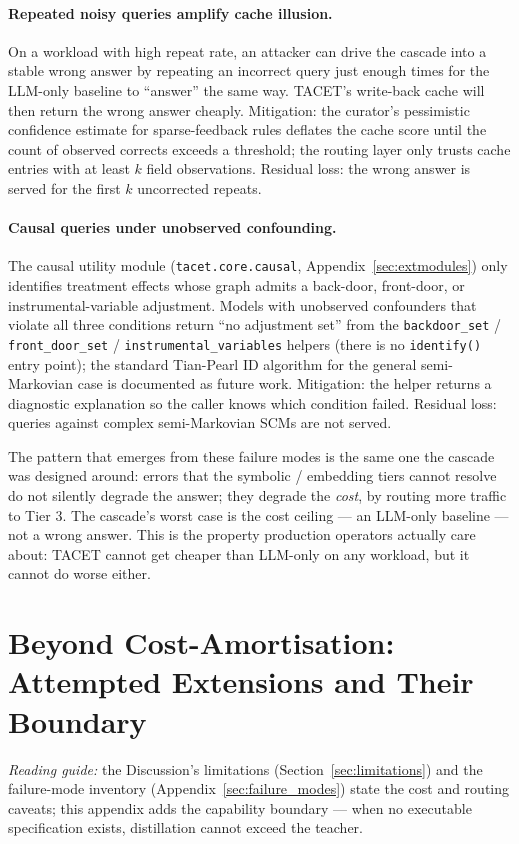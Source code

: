 \documentclass[11pt]{article}
\theoremstyle{plain}
\begin{document}
\paragraph{Repeated noisy queries amplify cache illusion.}
On a workload with high repeat rate, an attacker can drive the
cascade into a stable wrong answer by repeating an incorrect query
just enough times for the LLM-only baseline to ``answer'' the same
way.  TACET's write-back cache will then return the wrong answer
cheaply.  Mitigation: the curator's pessimistic confidence estimate
for sparse-feedback rules deflates the cache score until the count
of observed corrects exceeds a threshold; the routing layer only
trusts cache entries with at least $k$ field observations.  Residual
loss: the wrong answer is served for the first $k$ uncorrected
repeats.

\paragraph{Causal queries under unobserved confounding.}
The causal utility module (\texttt{tacet.core.causal},
Appendix~\ref{sec:extmodules}) only identifies treatment effects whose
graph admits a back-door, front-door, or instrumental-variable
adjustment.  Models with
unobserved confounders that violate all three conditions return
``no adjustment set'' from the \texttt{backdoor\_set} /
\texttt{front\_door\_set} / \texttt{instrumental\_variables} helpers (there is
no \texttt{identify()} entry point); the
standard Tian-Pearl ID algorithm for the general semi-Markovian case is
documented as future work.  Mitigation: the helper returns a
diagnostic explanation so the caller knows which condition failed.
Residual loss: queries against complex semi-Markovian SCMs are not
served.

The pattern that emerges from these failure modes is the same one
the cascade was designed around: errors that the symbolic /
embedding tiers cannot resolve do not silently degrade the answer;
they degrade the \emph{cost}, by routing more traffic to Tier 3.
The cascade's worst case is the cost ceiling --- an LLM-only
baseline --- not a wrong answer.  This is the property production
operators actually care about: TACET cannot get cheaper than
LLM-only on any workload, but it cannot do worse either.

\section{Beyond Cost-Amortisation: Attempted Extensions and Their Boundary}
\label{sec:boundary}
\noindent\emph{Reading guide:} the Discussion's limitations
(Section~\ref{sec:limitations}) and the failure-mode inventory
(Appendix~\ref{sec:failure_modes}) state the cost and routing caveats; this
appendix adds the capability boundary --- when no executable specification
exists, distillation cannot exceed the teacher.
\end{document}
